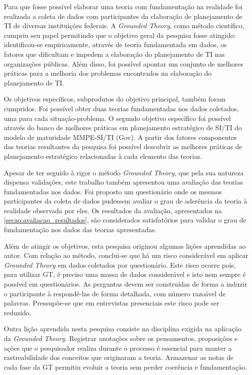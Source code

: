 Para que fosse possível elaborar uma teoria com fundamentação na realidade foi realizada a coleta de dados com participantes da elaboração de planejamento de TI de diversas instituições federais. A \textit{Grounded Theory}, como método científico, cumpriu seu papel permitindo que o objetivo geral da pesquisa fosse atingido: identificou-se empiricamente, através de teoria fundamentada em dados, os fatores que dificultam e impedem a elaboração do planejamento de TI nas organizações públicas. Além disso, foi possível apontar um conjunto de melhores práticas para a melhoria dos problemas encontrados na elaboração do planejamento de TI.

Os objetivos específicos, subprodutos do objetivo principal, também foram cumpridos. Foi possível obter duas teorias fundamentadas nos dados coletados, uma para cada situação-problema. O segundo objetivo específico foi possível através do banco de melhores práticas em planejamento estratégico de SI/TI do modelo de maturidade MMPE-SI/TI (Gov). A partir dos fatores componentes das teorias resultantes da pesquisa foi possível descobrir as melhores práticas de planejamento estratégico relacionadas à cada elemento das teorias. 

Apesar de ter seguido à rigor o método \textit{Grounded Theory}, que pela sua natureza dispensa validações, este trabalho também apresentou uma avaliação das teorias fundamentadas nos dados. Foi proposto um questionário onde os mesmos participantes da coleta de dados pudessem avaliar o grau de aderência da teoria à realidade observada por eles. Os resultados da avaliação, apresentados na \autoref{secao:avaliacao_resultados}, são considerados satisfatórios para validar o grau de fundamentação nos dados das teorias apresentadas.

Além de atingir os objetivos, esta pesquisa originou algumas lições aprendidas ao autor. Com relação ao método, conclui-se que há um risco considerável em aplicar \textit{Grounded Theory} em dados coletados por questionário. Este risco ocorre pois, para utilizar GT, é preciso uma massa de dados considerável e isto nem sempre é possível em questionários. As perguntas devem ser construídas de forma a induzir o participante à respondê-las de forma detalhada, com número razoável de palavras. Pressupõe-se que em entrevistas presenciais este risco pode ser reduzido.

Outra lição aprendida nesta pesquisa consiste na disciplina exigida na aplicação da \textit{Grounded Theory}. Registrar anotações sobre os pensamentos, proposições e ações que o pesquisador realiza durante o processo é essencial para manter a rastreabilidade dos conceitos que originaram a teoria. Armazenar as notas de cada fase da GT permitiu evoluir a teoria sem perder coerência e fundamentação.

